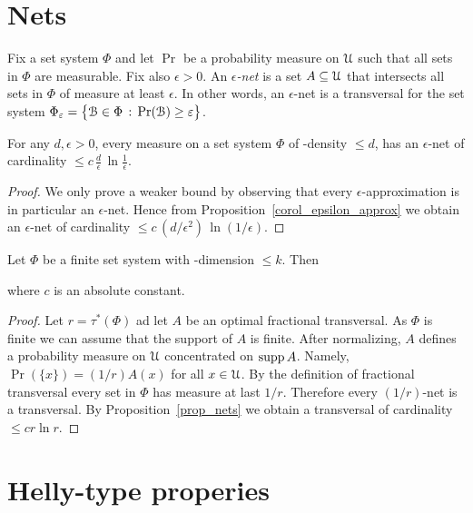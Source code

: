 \documentclass[sputnik.tex]{subfiles}
\begin{document}
\section{Nets}

Fix a set system $\Phi$ and let $\Pr$ be a probability measure on $\EuScript U$ such that all sets in $\Phi$ are measurable.
Fix also $\epsilon>0$.
An \emph{$\epsilon$-net\/} is a set $A\subseteq\EuScript U$ that intersects all sets in $\Phi$ of measure at least $\epsilon$.
In other words, an $\epsilon$-net is a transversal for the set system $\Phi_\varepsilon=\big\{\EuScript B\in\Phi\,:\,\Pr(\EuScript B)\ge\varepsilon\big\}$.

\begin{proposition}\label{prop_nets}
For any $d,\epsilon>0$, every measure on a set system $\Phi$ of \vc-density $\le d$, has an $\epsilon$-net of cardinality $\displaystyle\le c\,\frac d\epsilon\,\ln \frac1\epsilon$.
\end{proposition}

\begin{proof}
We only prove a weaker bound by observing that every $\epsilon$-approximation is in particular an $\epsilon$-net. Hence from Proposition~\ref{corol_epsilon_approx} we obtain an $\epsilon$-net of cardinality  $\displaystyle\le c\,(d/\epsilon^2)\,\ln(1/\epsilon)$.
\end{proof}




\begin{proposition}\label{prop_bound_fractional_trans}
Let $\Phi$ be a finite set system with \vc-dimension $\le k$. Then 


where $c$ is an absolute constant.
\end{proposition}

\begin{proof}
Let $r=\tau^*(\Phi)$ ad let $A$ be an optimal fractional transversal.
As $\Phi$ is finite we can assume that the support of $A$ is finite.
After normalizing, $A$ defines a probability measure on $\EuScript U$ concentrated on $\mathop{\rm supp} A$.
Namely, $\Pr(\{x\})=(1/r)A(x)$ for all $x\in\EuScript U$.
By the definition of fractional transversal every set in $\Phi$ has measure at last $1/r$.
Therefore every $(1/r)$-net is a transversal.
By Proposition~\ref{prop_nets} we obtain a transversal of cardinality $\le c r \ln r$.
\end{proof}

\section{Helly-type properies}
\end{document}
